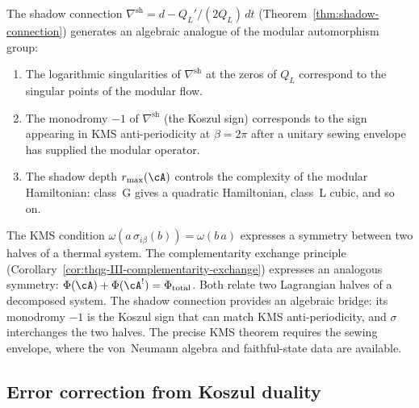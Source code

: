 \begin{conjecture}
\ClaimStatusConjectured
\label{conj:thqg-modular-flow}
The shadow connection
$\nabla^{\mathrm{sh}} = d - Q_L'/(2Q_L)\, dt$
(Theorem~\ref{thm:shadow-connection})
generates an algebraic analogue of the modular automorphism group:
\begin{enumerate}[label=\textup{(\roman*)}]
\item The logarithmic singularities of $\nabla^{\mathrm{sh}}$
 at the zeros of $Q_L$ correspond to the singular points of
 the modular flow.
\item The monodromy $-1$ of $\nabla^{\mathrm{sh}}$
 (the Koszul sign) corresponds to the
 sign appearing in KMS anti-periodicity at $\beta = 2\pi$ after a
 unitary sewing envelope has supplied the modular operator.
\item The shadow depth $r_{\max}(\cA)$ controls the complexity
 of the modular Hamiltonian: class~G gives a quadratic
 Hamiltonian, class~L cubic, and so on.
\end{enumerate}
\end{conjecture}

\begin{remark}
\label{rem:thqg-kms-from-complementarity}
The KMS condition
$\omega(a\, \sigma_{i\beta}(b)) = \omega(b\, a)$
expresses a symmetry between two halves of a thermal system.
The complementarity exchange principle
(Corollary~\ref{cor:thqg-III-complementarity-exchange})
expresses an analogous symmetry:
$\Phi(\cA) + \Phi(\cA^!) = \Phi_{\mathrm{total}}$.
Both relate two Lagrangian halves of a decomposed system.
The shadow connection provides an algebraic bridge: its monodromy
$-1$ is the Koszul sign that can match KMS anti-periodicity, and
$\sigma$ interchanges the two halves.  The precise KMS theorem
requires the sewing envelope, where the von~Neumann algebra and
faithful-state data are available.
\end{remark}

%
%

\subsection{Error correction from Koszul duality}
\label{subsec:thqg-entanglement-error-correction}


